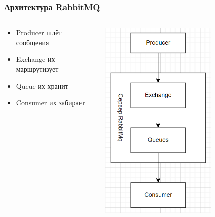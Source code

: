 \documentclass{../../slides-style}
\begin{document}
    \begin{frame}
        \frametitle{Архитектура RabbitMQ}
        \begin{columns}
            \begin{column}{0.6\textwidth}
                \begin{itemize}
                    \item Producer шлёт сообщения
                    \item Exchange их маршрутизует
                    \item Queue их хранит
                    \item Consumer их забирает
                \end{itemize}
            \end{column}
            \begin{column}{0.4\textwidth}
                \includegraphics[width=0.7\textwidth]{rabbitMqArchitecture.png}
            \end{column}
        \end{columns}
    \end{frame}
\end{document}
